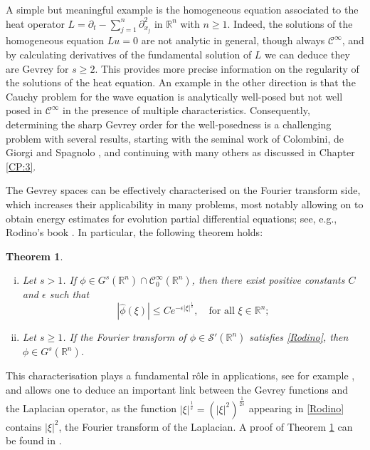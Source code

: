 \documentclass[12pt,oneside,a4paper]{book}
\numberwithin{equation}{section}     %
\theoremstyle{plain}
\newtheorem{theorem}{Theorem}[section]
\theoremstyle{definition}
\newcommand{\R}{{\mathbb R}}
\newcommand{\Rn}{{\R}^n}
\begin{document}
A simple but meaningful example is the homogeneous equation associated to the heat operator $L=\partial_{t}-\sum_{j=1}^{n}\partial_{x_j}^2$ in $\Rn$ with $n\geq 1$. Indeed, the solutions of the homogeneous equation $Lu=0$ are not analytic in general, though always $\mathcal C^\infty$, and by calculating derivatives of the fundamental solution of $L$ we can deduce they are Gevrey for $s\geq 2$. This provides more precise information on the regularity of the solutions of the heat equation. An example in the other direction is that the Cauchy problem for the wave equation is analytically well-posed but not well posed in $\mathcal C^\infty$ in the presence of multiple characteristics. Consequently, determining the sharp Gevrey order for the well-posedness is a challenging problem with several results, starting with the seminal work of Colombini, de Giorgi and Spagnolo \cite{CDS79}, and continuing with many others as discussed in Chapter \ref{CP:3}.

The Gevrey spaces can be effectively characterised on the Fourier transform side, which increases their applicability in many problems, most notably allowing on to obtain energy estimates for evolution partial differential equations; see, e.g., Rodino's book \cite{R1993}. In particular, the following theorem holds:
\begin{theorem}\label{Thm:Rodino}~\newline
	\begin{enumerate}[i.]
		\item Let $s>1$. If $\phi\in G^s(\Rn)\cap\mathcal{C}^\infty_0(\Rn)$, then there exist positive constants $C$ and $\epsilon$ such
		that
		\begin{equation}\label{Rodino}
		|\widehat\phi(\xi)|\leq C e^{-\epsilon |\xi|^{\frac{1}{s}}},\quad\text{for all }\xi\in\Rn;
		\end{equation}
		\item Let $s\geq 1$. If the Fourier transform of $\phi\in \mathcal S'(\Rn)$ satisfies \eqref{Rodino}, then $\phi\in G^s(\Rn)$.
	\end{enumerate}
\end{theorem}
This characterisation plays a fundamental r\^ole in applications, see for example \cite{DFT2009}, and allows one to deduce an important link between the Gevrey functions and the Laplacian operator, as the function $ |\xi|^{\frac{1}{s}}=(|\xi|^2)^{\frac{1}{2s}}$ appearing in \eqref{Rodino} contains $|\xi|^2$, the Fourier transform of the Laplacian. A proof of Theorem \ref{Thm:Rodino} can be found in \cite{R1993}.
\end{document}
